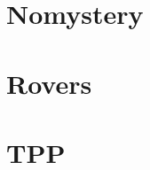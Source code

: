 \documentclass[12pt]{article}
\begin{document}
\section{Nomystery}



\newpage
\section{Rovers}




\newpage
\section{TPP}


\end{document}
